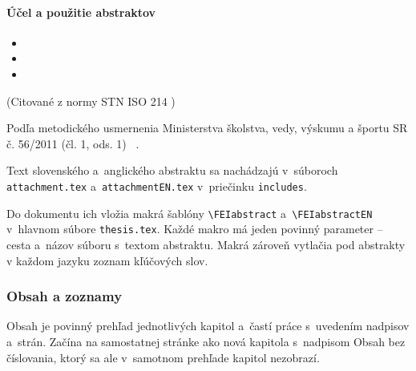 \paragraph{Účel a použitie abstraktov}
\begin{itemize}\it
  \item {}

  \item {}

  \item {}
\end{itemize}
\begin{flushright}
(Citované z normy STN ISO 214 \cite{iso214})
\end{flushright}

Podľa metodického usmernenia Ministerstva školstva, vedy, výskumu a športu SR č. 56/2011 (čl. 1, ods. 1)
\emph{}~\cite{usmernenie562011}.

Text slovenského a~anglického abstraktu sa nachádzajú
v~súboroch \verb|attachment.tex| a~\verb|attachmentEN.tex| v~priečinku \verb|includes|.

Do dokumentu ich vložia makrá šablóny
\verb|\FEIabstract| a~\verb|\FEIabstractEN|
v~hlavnom súbore \verb|thesis.tex|.
Každé makro má jeden povinný parameter --
cesta a~názov súboru s~textom abstraktu.
Makrá zároveň vytlačia pod abstrakty
v každom jazyku zoznam kľúčových slov.

\subsubsection{Obsah a zoznamy}
Obsah je povinný prehľad jednotlivých kapitol
a~častí práce s~uvedením nadpisov a~strán.
Začína na samostatnej stránke ako nová kapitola
s~nadpisom Obsah bez číslovania,
ktorý sa ale v~samotnom prehľade kapitol nezobrazí.

